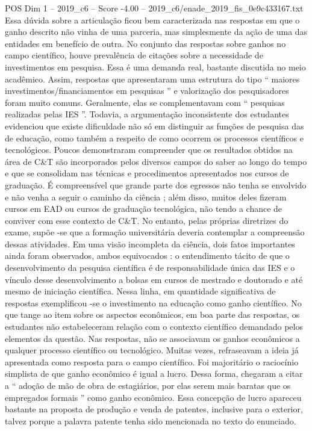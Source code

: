 \begin{textsample}{POS Dim 1 – 2019\_c6 – Score -4.00 – 2019\_c6/enade\_2019\_fis\_0e9c433167.txt}
Essa dúvida sobre a articulação ficou bem caracterizada nas respostas em que o ganho descrito não vinha de uma parceria, mas simplesmente da ação de uma das entidades em benefício de outra.
No conjunto das respostas sobre ganhos no campo científico, houve prevalência de citações sobre a necessidade de investimentos em pesquisa.
Essa é uma demanda real, bastante discutida no meio acadêmico.
Assim, respostas que apresentaram uma estrutura do tipo “ maiores investimentos/financiamentos em pesquisas ” e valorização dos pesquisadores foram muito comuns.
Geralmente, elas se complementavam com “ pesquisas realizadas pelas IES ”.
Todavia, a argumentação inconsistente dos estudantes evidenciou que existe dificuldade não só em distinguir as funções de pesquisa das de educação, como também a respeito de como ocorrem os processos científicos e tecnológicos.
Poucos demonstraram compreender que os resultados obtidos na área de C\&T são incorporados pelos diversos campos do saber ao longo do tempo e que se consolidam nas técnicas e procedimentos apresentados nos cursos de graduação.
É compreensível que grande parte dos egressos não tenha se envolvido e não venha a seguir o caminho da ciência ; além disso, muitos deles fizeram cursos em EAD ou cursos de graduação tecnológica, não tendo a chance de conviver com esse contexto de C\&T.
No entanto, pelas próprias diretrizes do exame, supõe -se que a formação universitária deveria contemplar a compreensão dessas atividades.
Em uma visão incompleta da ciência, dois fatos importantes ainda foram observados, ambos equivocados : o entendimento tácito de que o desenvolvimento da pesquisa científica é de responsabilidade única das IES e o vínculo desse desenvolvimento a bolsas em cursos de mestrado e doutorado e até mesmo de iniciação científica.
Nessa linha, em quantidade significativa de respostas exemplificou -se o investimento na educação como ganho científico.
No que tange ao item sobre os aspectos econômicos, em boa parte das respostas, os estudantes não estabeleceram relação com o contexto científico demandado pelos elementos da questão.
Nas respostas, não se associavam os ganhos econômicos a qualquer processo científico ou tecnológico.
Muitas vezes, refraseavam a ideia já apresentada como resposta para o campo científico.
Foi majoritário o raciocínio simplista de que ganho econômico é igual a lucro.
Dessa forma, chegaram a citar a “ adoção de mão de obra de estagiários, por elas serem mais baratas que os empregados formais ” como ganho econômico.
Essa concepção de lucro apareceu bastante na proposta de produção e venda de patentes, inclusive para o exterior, talvez porque a palavra patente tenha sido mencionada no texto do enunciado.

\end{textsample}
